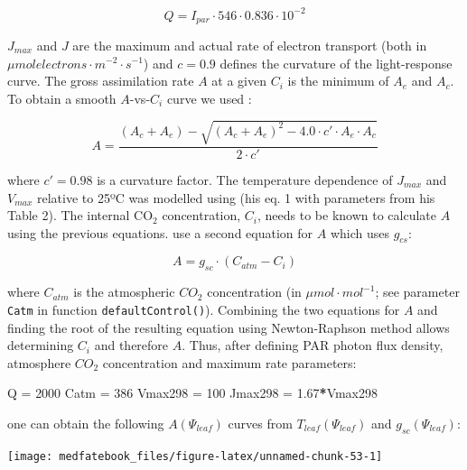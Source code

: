 \documentclass[]{book}
\newenvironment{Shaded}{\begin{snugshade}}{\end{snugshade}}
\newcommand{\DecValTok}[1]{\textcolor[rgb]{0.00,0.00,0.81}{#1}}
\newcommand{\FloatTok}[1]{\textcolor[rgb]{0.00,0.00,0.81}{#1}}
\newcommand{\StringTok}[1]{\textcolor[rgb]{0.31,0.60,0.02}{#1}}
\newcommand{\OperatorTok}[1]{\textcolor[rgb]{0.81,0.36,0.00}{\textbf{#1}}}
\newcommand{\NormalTok}[1]{#1}
\begin{document}
\begin{equation}
Q = I_{par}\cdot 546 \cdot 0.836\cdot 10^{-2}
\end{equation}

\(J_{max}\) and \(J\) are the maximum and actual rate of electron
transport (both in \(\mu mol electrons \cdot m^{-2} \cdot s^{-1}\)) and
\(c=0.9\) defines the curvature of the light-response curve. The gross
assimilation rate \(A\) at a given \(C_i\) is the minimum of \(A_e\) and
\(A_c\). To obtain a smooth \(A\)-vs-\(C_i\) curve we used
\citep{Collatz1991}:

\begin{equation}
A = \frac{(A_c+A_e)-\sqrt{(A_c+A_e)^2-4.0\cdot c'\cdot A_e\cdot A_c}}{2\cdot c'}
\end{equation}

where \(c'=0.98\) is a curvature factor. The temperature dependence of
\(J_{max}\) and \(V_{max}\) relative to 25ºC was modelled using
\citet{Leuning2002} (his eq. 1 with parameters from his Table 2). The
internal CO\(_2\) concentration, \(C_i\), needs to be known to calculate
\(A\) using the previous equations. \citet{Sperry2016a} use a second
equation for \(A\) which uses \(g_{cs}\):

\begin{equation}
A = g_{sc} \cdot (C_{atm}-C_i)
\end{equation}

where \(C_{atm}\) is the atmospheric \(CO_{2}\) concentration (in
\(\mu mol \cdot mol^{-1}\); see parameter \texttt{Catm} in function
\texttt{defaultControl()}). Combining the two equations for \(A\) and
finding the root of the resulting equation using Newton-Raphson method
allows determining \(C_i\) and therefore \(A\). Thus, after defining PAR
photon flux density, atmosphere \(CO_{2}\) concentration and maximum
rate parameters:

\begin{Shaded}
\begin{Highlighting}[]
\NormalTok{Q =}\StringTok{ }\DecValTok{2000}
\NormalTok{Catm =}\StringTok{ }\DecValTok{386}
\NormalTok{Vmax298 =}\StringTok{ }\DecValTok{100}
\NormalTok{Jmax298 =}\StringTok{ }\FloatTok{1.67}\OperatorTok{*}\NormalTok{Vmax298}
\end{Highlighting}
\end{Shaded}

one can obtain the following \(A(\Psi_{leaf})\) curves from
\(T_{leaf}(\Psi_{leaf})\) and \(g_{sc}(\Psi_{leaf})\):

\begin{center}\texttt{[image: medfatebook\_files/figure-latex/unnamed-chunk-53-1]} \end{center}
\end{document}
